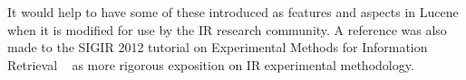 It would help to have some of these introduced as features and aspects
in Lucene when it is modified for use by the IR research community. A
reference was also made to the SIGIR 2012 tutorial on Experimental
Methods for Information Retrieval
~\cite{Metzler:2012:EMI:2348283.2348534} as more rigorous exposition
on IR experimental methodology.
